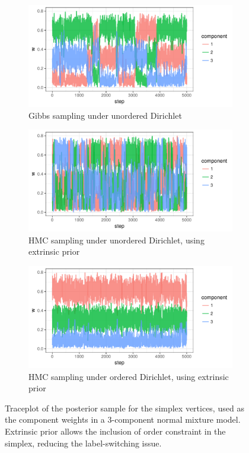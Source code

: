 \documentclass[10pt]{article}
\DeclareMathOperator{\1}{\mathbbm{1}}
\begin{document}
\begin{figure}[H]
 \centering
   \begin{subfigure}[b]{0.32\textwidth}
    \includegraphics[width=1\textwidth]{fmm_w_gibbs.pdf}
    \caption{Gibbs sampling under unordered Dirichlet}
    \end{subfigure}
       \begin{subfigure}[b]{0.32\textwidth}
  \includegraphics[width=1\textwidth]{fmm_w_hmc_unordered.pdf}
    \caption{HMC sampling under unordered Dirichlet, using extrinsic prior}
      \end{subfigure}
       \begin{subfigure}[b]{0.32\textwidth}
 \includegraphics[width=1\textwidth]{fmm_w_hmc.pdf}
     \caption{HMC sampling under ordered Dirichlet, using extrinsic prior}
     \end{subfigure}
\caption{Traceplot of the posterior sample for the simplex vertices, used as the component weights in a 3-component normal mixture model. Extrinsic prior allows the inclusion of order constraint in the simplex, reducing the label-switching issue.}
\label{dirichlet}
\end{figure}
\end{document}
